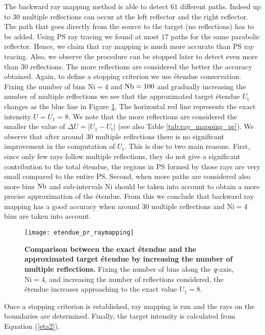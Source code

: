The backward ray mapping method is able to detect $61$ different paths. Indeed up to $30$ multiple reflections can occur at the left reflector and the right reflector. The path that goes directly from the source to the target (no reflections) has to be added. Using PS ray tracing we found at most $17$ paths for the same parabolic reflector. Hence, we claim that ray mapping is much more accurate than PS ray tracing. Also, we observe the procedure can be stopped later to detect even more than $30$ reflections. The more reflections are considered the better the accuracy obtained. Again, to define a stopping criterion we use \'{e}tendue conservation. Fixing the number of bins $\textrm{Ni}=4$ and $\textrm{Nb}=100$ and gradually increasing the number of multiple reflections we see that the approximated target \'{e}tendue $U_{\textrm{t}}$ changes as the blue line in Figure \ref{fig:etendue_pr_raymapping}. The horizontal red line represents the exact intensity $U = U_{1} = 8$. We note that the more reflections are considered the smaller the value of $\Delta U = |U_1-U_{\textrm{t}}|$ (see also Table \ref{tab:ray_mapping_pr}). We observe that after around $30$ multiple reflections there is no significant improvement in the computation of $U_{\textrm{t}}$. This is due to two main reasons. First, since only few rays follow multiple reflections, they do not give a significant contribution to the total \'{e}tendue, the regions in PS formed by those rays are very small compared to the entire PS. Second, when more paths are considered also more bins $\textrm{Nb}$ and sub-intervals $\textrm{Ni}$ should be taken into account to obtain a more precise approximation of the \'{e}tendue. From this we conclude that backward ray mapping has a good accuracy when around $30$ multiple reflections and $\textrm{Ni}=4$ bins are taken into account.
\begin{figure}[h]
  \begin{center}
  \texttt{[image: etendue\_pr\_raymapping]}
  \end{center}
  \caption{\textbf{Comparison between the exact \'{e}tendue and the approximated target \'{e}tendue by increasing the number of multiple reflections.}
Fixing the number of bins along the $\textit{q}$-axis, $\textrm{Ni}=4$, and increasing the number of reflections considered, the \'{e}tendue increases approaching to the exact value $U_1=8$.}
\label{fig:etendue_pr_raymapping}
 \end{figure}
Once a stopping criterion is established, ray mapping is run and the rays on the boundaries are determined. Finally, the target intensity is calculated from Equation (\ref{eta2}). 
